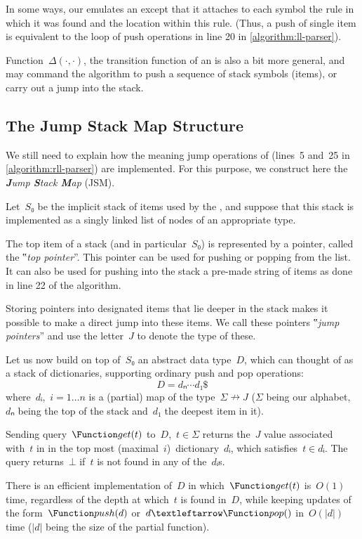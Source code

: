 In some ways, our \RLLp emulates an \LLp except that it attaches to each symbol
the rule in which it was found and the location within this rule.
(Thus, a push of single item is equivalent to the loop of push operations in
line 20 in \cref{algorithm:ll-parser}).

Function~$Δ(·,·)$, the transition function of an \RLLp is also a bit more
general, and may command the algorithm to push a sequence of stack symbols
(items), or carry out a jump into the stack.

\subsection{The Jump Stack Map Structure}
\label{section:jump}
We still need to explain how the meaning jump operations of \RLLp (lines~5
and~25 in \cref{algorithm:rll-parser}) are implemented. For this purpose, we
construct here the \emph{\textbf Jump \textbf Stack \textbf Map} (JSM).

Let~$S₀$ be the implicit stack of items used by the \RLLp, and suppose that
this stack is implemented as a singly linked list of nodes of an appropriate
type.

The top item of a stack (and in particular~$S₀$) is represented by a pointer,
called the ‟\emph{top pointer}”. This pointer can be used for pushing or
popping from the list. It can also be used for pushing into the stack a
pre-made string of items as done in line 22 of the \RLLp algorithm.

Storing pointers into designated items that lie deeper in the stack makes it
possible to make a direct jump into these items. We call these pointers
‟\emph{jump pointers}” and use the letter~$J$ to denote the type of these.

Let us now build on top of~$S₀$ an abstract data type~$D$, which can thought of
as a stack of dictionaries, supporting ordinary push and pop operations:
\[
  D=dₙ⋯d₁\$
\]
where~$dᵢ$,~$i=1…n$ is a (partial) map of the type~$Σ↛J$ ($Σ$ being our
alphabet,~$dₙ$ being the top of the stack and~$d₁$ the deepest item in it).

Sending query~$\Function get(t)$ to~$D$,~$t∈Σ$ returns the~$J$ value
associated with~$t$ in in the top most (maximal~$i$)~dictionary~$dᵢ$, which
satisfies~$t∈dᵢ$. The query returns~$⊥$ if~$t$ is not found in any of
the~$dᵢ$s.

There is an efficient implementation of~$D$ in which~$\Function get(t)$
is~$O(1)$ time, regardless of the depth at which~$t$ is found in~$D$, while
keeping updates of the form~$\Function push(d)$ or~$d←\Function pop()$
in~$O(|d|)$ time ($|d|$ being the size of the partial function).

